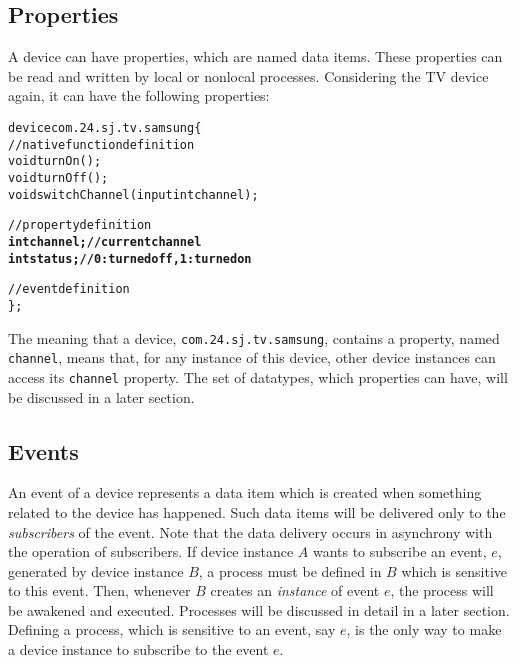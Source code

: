 \documentclass{note}
\begin{document}
\subsection{Properties}
A device can have properties, which are named data items.
These properties can be read and written by local or nonlocal processes.
Considering the TV device again, it can have the following properties:
\begin{alltt}
  device com.24.sj.tv.samsung \{
    // native function definition
    void turnOn();
    void turnOff(); 
    void switchChannel(input int channel);

    // property definition
    \textbf{int channel;     // current channel
    int status;      // 0: turned off, 1: turned on}

    // event definition
  \};
\end{alltt}
The meaning that a device, \verb+com.24.sj.tv.samsung+, contains a 
property, named \verb+channel+, means that, for any instance of this device,
other device instances can access its \verb+channel+ property.
The set of datatypes, which properties can have, will be discussed in a later
section. 

\subsection{Events}
An event of a device represents a data item which is created when something
related to the device has happened. Such data items will be delivered only to
the {\em subscribers\/} of the event. Note that the data delivery occurs in
asynchrony with the operation of subscribers. If device instance $A$ wants to
subscribe an event, $e$,
generated by device instance $B$, a process must be defined in $B$ which is
sensitive to this event. Then, whenever $B$ creates an {\em instance\/} of
event $e$, the process will be awakened and executed.
Processes will be discussed in detail in a later
section. Defining a process, which is sensitive to an event, say $e$, is
  the only way to make a device instance to subscribe to the event $e$.
\end{document}
